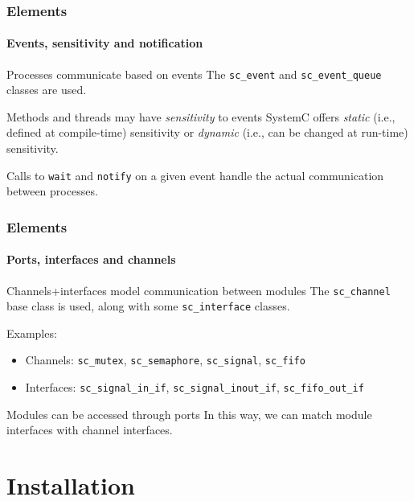 \begin{frame}
\frametitle{Elements}
\framesubtitle{Events, sensitivity and notification}

\begin{block}{Processes communicate based on events}
The \texttt{sc\_event} and \texttt{sc\_event\_queue} classes are used.
\end{block}
\begin{block}{Methods and threads may have {\em sensitivity} to events}
SystemC offers {\em static} (i.e., defined at compile-time) sensitivity or {\em dynamic} (i.e., can be changed at run-time) sensitivity.

\medskip
Calls to \texttt{wait} and \texttt{notify} on a given event handle the actual communication between processes.
\end{block}

\end{frame}

\begin{frame}
\frametitle{Elements}
\framesubtitle{Ports, interfaces and channels}

\begin{block}{Channels+interfaces model communication between modules}
The \texttt{sc\_channel} base class is used, along with some \texttt{sc\_interface} classes.
\end{block}
\pause
\begin{block}{Examples:}
\begin{itemize}
\item Channels: \texttt{sc\_mutex}, \texttt{sc\_semaphore}, \texttt{sc\_signal}, \texttt{sc\_fifo}
\item Interfaces: \texttt{sc\_signal\_in\_if}, \texttt{sc\_signal\_inout\_if}, \texttt{sc\_fifo\_out\_if}
\end{itemize}
\end{block}
\pause
\begin{block}{Modules can be accessed through ports}
In this way, we can match module interfaces with channel interfaces.
\end{block}

\end{frame}

\section{Installation}

